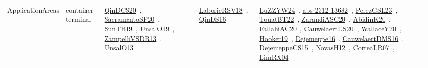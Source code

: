 {\begin{longtable}{lp{3cm}>{\raggedright\arraybackslash}p{6cm}>{\raggedright\arraybackslash}p{6cm}>{\raggedright\arraybackslash}p{8cm}}
\index{container terminal}\index{ApplicationAreas!container terminal}ApplicationAreas & container terminal & \href{../works/QinDCS20.pdf}{QinDCS20}~\cite{QinDCS20}, \href{../works/SacramentoSP20.pdf}{SacramentoSP20}~\cite{SacramentoSP20}, \href{../works/SunTB19.pdf}{SunTB19}~\cite{SunTB19}, \href{../works/UnsalO19.pdf}{UnsalO19}~\cite{UnsalO19}, \href{../works/ZampelliVSDR13.pdf}{ZampelliVSDR13}~\cite{ZampelliVSDR13}, \href{../works/UnsalO13.pdf}{UnsalO13}~\cite{UnsalO13} & \href{../works/LaborieRSV18.pdf}{LaborieRSV18}~\cite{LaborieRSV18}, \href{../works/QinDS16.pdf}{QinDS16}~\cite{QinDS16} & \href{../works/LuZZYW24.pdf}{LuZZYW24}~\cite{LuZZYW24}, \href{../works/abs-2312-13682.pdf}{abs-2312-13682}~\cite{abs-2312-13682}, \href{../works/PerezGSL23.pdf}{PerezGSL23}~\cite{PerezGSL23}, \href{../works/TouatBT22.pdf}{TouatBT22}~\cite{TouatBT22}, \href{../works/ZarandiASC20.pdf}{ZarandiASC20}~\cite{ZarandiASC20}, \href{../works/AbidinK20.pdf}{AbidinK20}~\cite{AbidinK20}, \href{../works/FallahiAC20.pdf}{FallahiAC20}~\cite{FallahiAC20}, \href{../works/CauwelaertDS20.pdf}{CauwelaertDS20}~\cite{CauwelaertDS20}, \href{../works/WallaceY20.pdf}{WallaceY20}~\cite{WallaceY20}, \href{../works/Hooker19.pdf}{Hooker19}~\cite{Hooker19}, \href{../works/Dejemeppe16.pdf}{Dejemeppe16}~\cite{Dejemeppe16}, \href{../works/CauwelaertDMS16.pdf}{CauwelaertDMS16}~\cite{CauwelaertDMS16}, \href{../works/DejemeppeCS15.pdf}{DejemeppeCS15}~\cite{DejemeppeCS15}, \href{../works/NovasH12.pdf}{NovasH12}~\cite{NovasH12}, \href{../works/CorreaLR07.pdf}{CorreaLR07}~\cite{CorreaLR07}, \href{../works/LimRX04.pdf}{LimRX04}~\cite{LimRX04}\\

\end{longtable}}
